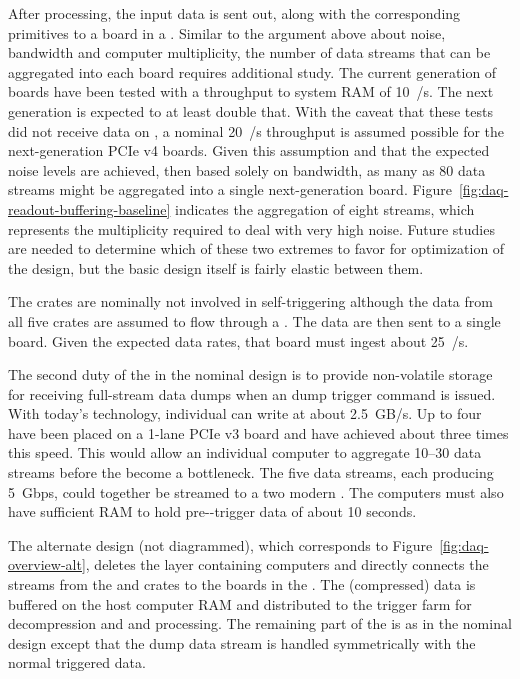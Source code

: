 After processing, the input data is sent out, along with the
corresponding primitives to a  board in a . 
Similar to the argument above about noise, bandwidth and  computer
multiplicity, the number of  data streams that can be aggregated
into each  board requires additional study. 
The current generation of  boards have been tested with a
throughput to system RAM of \SI{10}{\GB/\s}. 
The next generation is expected to at least double that. 
With the caveat that these tests did not receive data on , a nominal
\SI{20}{\GB/\s} throughput is assumed possible for the next-generation
PCIe v4 boards. 
Given this assumption and that the expected noise levels are achieved,
then based solely on bandwidth, as many as \num{80}  data streams might be
aggregated into a single next-generation  board. 
Figure~\ref{fig:daq-readout-buffering-baseline} indicates the
aggregation of eight  streams, which represents the multiplicity
required to deal with very high noise. 
Future studies are needed to determine %
which of these two extremes to favor for optimization of the design,
but the basic design itself is
fairly elastic between them.

The  crates are nominally not involved in self-triggering although
the data from all five  crates are assumed to flow through a  . 
The data are then sent to a
single  board. 
Given the expected data rates, that  board must ingest about
\SI{25}{\GB/\s}.

The second duty of the  in the nominal design is to
provide non-volatile storage for receiving full-stream data dumps when
an  dump trigger command is issued. 
With today's technology, individual  can write at about \SI{2.5}{GB/s}. 
Up to four  have been placed on a \num{1}-lane PCIe v3 board and have
achieved about three times this speed. 
This would allow an individual  computer to aggregate \numrange{10}{30} 
data streams before the  become a bottleneck. 
The five  data streams, each producing \SI{5}{Gbps}, could together be
streamed to a two modern . %
The  computers must also have sufficient RAM to hold
pre--trigger data of about \num{10} seconds.

The alternate design (not diagrammed), which corresponds to
Figure~\ref{fig:daq-overview-alt}, deletes the layer containing 
computers and directly connects the  streams from the  and 
crates to the  boards in the . 
The  (compressed) data is buffered on the  host computer RAM
and distributed to the trigger farm for decompression and  and  processing. 
The remaining part of the  is as in the nominal
design except that the  dump data stream is handled symmetrically
with the normal triggered data.
